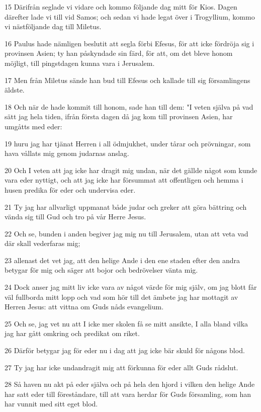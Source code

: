 \par 15 Därifrån seglade vi vidare och kommo följande dag mitt för Kios. Dagen därefter lade vi till vid Samos; och sedan vi hade legat över i Trogyllium, kommo vi nästföljande dag till Miletus.
\par 16 Paulus hade nämligen beslutit att segla förbi Efesus, för att icke fördröja sig i provinsen Asien; ty han påskyndade sin färd, för att, om det bleve honom möjligt, till pingstdagen kunna vara i Jerusalem.
\par 17 Men från Miletus sände han bud till Efesus och kallade till sig församlingens äldste.
\par 18 Och när de hade kommit till honom, sade han till dem: "I veten själva på vad sätt jag hela tiden, ifrån första dagen då jag kom till provinsen Asien, har umgåtts med eder:
\par 19 huru jag har tjänat Herren i all ödmjukhet, under tårar och prövningar, som hava vållats mig genom judarnas anslag.
\par 20 Och I veten att jag icke har dragit mig undan, när det gällde något som kunde vara eder nyttigt, och att jag icke har försummat att offentligen och hemma i husen predika för eder och undervisa eder.
\par 21 Ty jag har allvarligt uppmanat både judar och greker att göra bättring och vända sig till Gud och tro på vår Herre Jesus.
\par 22 Och se, bunden i anden begiver jag mig nu till Jerusalem, utan att veta vad där skall vederfaras mig;
\par 23 allenast det vet jag, att den helige Ande i den ene staden efter den andra betygar för mig och säger att bojor och bedrövelser vänta mig.
\par 24 Dock anser jag mitt liv icke vara av något värde för mig själv, om jag blott får väl fullborda mitt lopp och vad som hör till det ämbete jag har mottagit av Herren Jesus: att vittna om Guds nåds evangelium.
\par 25 Och se, jag vet nu att I icke mer skolen få se mitt ansikte, I alla bland vilka jag har gått omkring och predikat om riket.
\par 26 Därför betygar jag för eder nu i dag att jag icke bär skuld för någons blod.
\par 27 Ty jag har icke undandragit mig att förkunna för eder allt Guds rådslut.
\par 28 Så haven nu akt på eder själva och på hela den hjord i vilken den helige Ande har satt eder till föreståndare, till att vara herdar för Guds församling, som han har vunnit med sitt eget blod.
